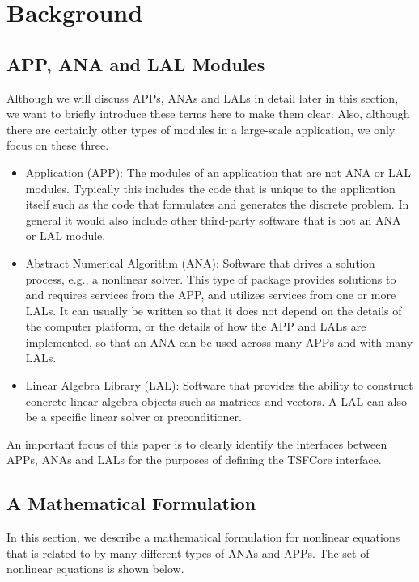 %
\section{Background}
\label{tsfcore:sec:background}
%

%
\subsection{APP, ANA and LAL Modules}
\label{tsfcore:sec:module_overview}
Although we will discuss APPs, ANAs and LALs in detail later in this
section, we want to briefly introduce these terms here to make them
clear.  Also, although there are certainly other types of modules 
in a large-scale application, we only focus on these three.
\begin{itemize}
\item Application (APP):  The modules of an application that are not
ANA or LAL modules.  Typically this includes 
the code that is unique to the application 
itself such as the code that formulates and
generates the discrete problem.  In general it would also include other
third-party software that is not an ANA or LAL module.
\item Abstract Numerical Algorithm (ANA):  Software that drives a 
solution process, e.g., a nonlinear solver.  This type of package 
provides solutions to and requires services from
the APP, and utilizes services from one or more LALs.  It can usually 
be written so that
it does not depend on the details of the computer platform, or the
details of how the APP and LALs are implemented, so that an ANA
can be used across many APPs and with many LALs.
\item Linear Algebra Library (LAL): Software that provides the 
ability to construct
concrete linear algebra objects such as matrices and vectors.  
A LAL can also be a specific linear solver or preconditioner.
\end{itemize}

An important focus of this paper is to clearly identify the interfaces 
between APPs, ANAs 
and LALs for the purposes of defining the TSFCore interface.

%
\subsection{A Mathematical Formulation}
\label{tsfcore:sec:math}
%

In this section, we describe a mathematical formulation for nonlinear
equations that is related to by many different types of ANAs and APPs.
The set of nonlinear equations is shown below.

